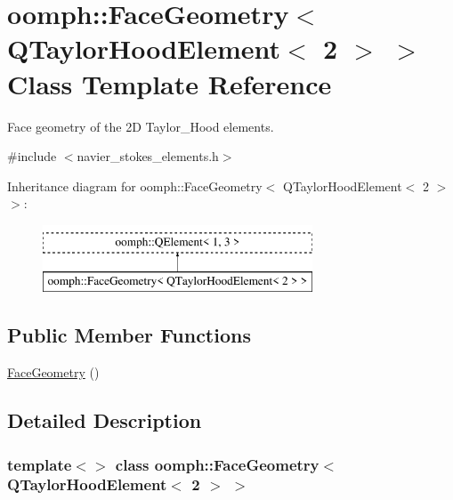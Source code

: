 \hypertarget{classoomph_1_1FaceGeometry_3_01QTaylorHoodElement_3_012_01_4_01_4}{}\section{oomph\+:\+:Face\+Geometry$<$ Q\+Taylor\+Hood\+Element$<$ 2 $>$ $>$ Class Template Reference}
\label{classoomph_1_1FaceGeometry_3_01QTaylorHoodElement_3_012_01_4_01_4}


Face geometry of the 2D Taylor\+\_\+\+Hood elements.  




{\ttfamily \#include $<$navier\+\_\+stokes\+\_\+elements.\+h$>$}

Inheritance diagram for oomph\+:\+:Face\+Geometry$<$ Q\+Taylor\+Hood\+Element$<$ 2 $>$ $>$\+:\begin{figure}[H]
\begin{center}
\leavevmode
\includegraphics[height=2.000000cm]{classoomph_1_1FaceGeometry_3_01QTaylorHoodElement_3_012_01_4_01_4}
\end{center}
\end{figure}
\subsection*{Public Member Functions}
\begin{DoxyCompactItemize}
\item 
\hyperlink{classoomph_1_1FaceGeometry_3_01QTaylorHoodElement_3_012_01_4_01_4_a1e10eeb6bc3011f4af30bfbeae0da456}{Face\+Geometry} ()
\end{DoxyCompactItemize}


\subsection{Detailed Description}
\subsubsection*{template$<$$>$\newline
class oomph\+::\+Face\+Geometry$<$ Q\+Taylor\+Hood\+Element$<$ 2 $>$ $>$}

